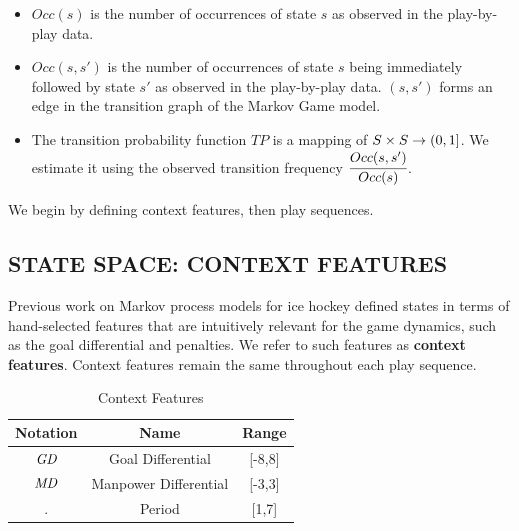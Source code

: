 \documentclass[]{article}
\begin{document}
\begin{itemize}
\item $Occ(s)$ is the number of occurrences of state $s$ as observed in the play-by-play data.
\item $Occ(s,s')$ is the number of occurrences of state $s$ being immediately followed by state $s'$ as observed in the play-by-play data. $(s,s')$ forms an edge in the transition graph of the Markov Game model.
\item The transition probability function $TP$ is a mapping of $S \times S \rightarrow (0,1]$. We estimate it using the observed transition frequency $\cfrac{Occ(s,s')}{Occ(s)}$.
\end{itemize}

We begin by defining context features, then play sequences.


\subsection{STATE SPACE: CONTEXT FEATURES}
\label{subsec:context}

Previous work on Markov process models for ice hockey \citep{Thomas2013} defined states in terms of hand-selected features that are intuitively relevant for the game dynamics, such as the goal differential and penalties.
We refer to such features as \textbf{context features}. Context features remain the same throughout each play sequence.

\begin{table}[htdp]
\caption{Context Features}
\label{table:context-features}
\begin{center}
\begin{tabular}{|c|c|c|}
\hline
Notation & Name & Range \\\hline
$\it{GD}$ & Goal Differential & [-8,8]\\ \hline
$\it{MD}$ & Manpower Differential & [-3,3]\\ \hline
$\period$ & Period & [1,7]\\\hline
\end{tabular}
\end{center}
\label{default}
\end{table}%
\end{document}
